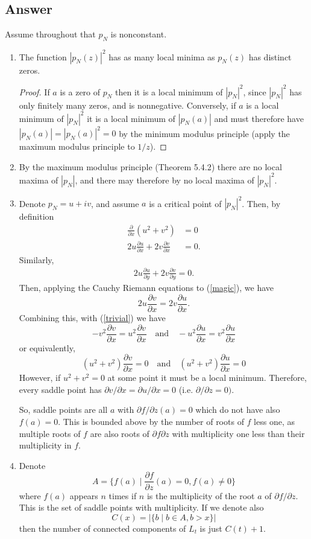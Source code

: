 \documentclass[11pt]{article}
\begin{document}
\subsection{Answer}
Assume throughout that $p_N$ is nonconstant.
\begin{enumerate}
\item The function $|p_N(z)|^2$ has as many local minima as $p_N(z)$ has distinct zeros. 
\begin{proof}
If $a$ is a zero of $p_N$ then it is a local minimum of $|p_N|^2$, since $|p_N|^2$ has only finitely many zeros, and is nonnegative. Conversely, if $a$ is a local minimum of $|p_N|^2$ it is a local minimum of  $|p_N(a)|$ and must therefore have $|p_N(a)| = |p_N(a)|^2 = 0 $ by the minimum modulus principle (apply the maximum modulus principle to $1/z$).
\end{proof}
\item By the maximum modulus principle (Theorem 5.4.2) there are no local maxima of $|p_N|$, and there may therefore by no local maxima of $|p_N|^2$.
\item Denote $p_N = u + i v$, and assume $a$ is a critical point of $|p_N|^2$. Then, by definition 
\begin{align}
\label{trivial} \frac{\partial}{\partial x} \left( u^2 + v^2 \right) &= 0\\
2 u \frac{\partial u}{\partial x}  + 2 v \frac{\partial v }{\partial x} &= 0.
\end{align}
Similarly, 
\begin{align}\label{magic}2u \frac{\partial u}{\partial y} + 2 v \frac{\partial v}{\partial y} = 0. \end{align}
Then, applying the Cauchy Riemann equations to  (\ref{magic}), we have
\[2 u \frac{\partial v}{\partial x} =  2 v \frac{\partial u }{\partial x}.\]
Combining this, with (\ref{trivial}) we have
\[- v^2 \frac{\partial v}{\partial x} = u^2 \frac{\partial v}{\partial x} \quad\mbox{and}\quad - u^2 \frac{\partial u}{\partial x} = v^2 \frac{\partial u}{\partial x} \]
or equivalently, 
\[ (u^2+ v^2) \frac{\partial v}{\partial x}  = 0 \quad\mbox{and}\quad ( u^2 + v^2) \frac{\partial u}{\partial x} = 0 \]
However, if $u^2 + v^2 =0$ at some point it must  be a local minimum. Therefore, every saddle point has $\partial v/ \partial x = \partial u / \partial x = 0$ (i.e. $\partial / \partial z = 0) $. 

So, saddle points are all $a$ with  $\partial f / \partial z ( a) = 0$ which do not have also $f(a) = 0$. This is bounded above by the number of roots of $f$ less one, as multiple roots of $f$ are also roots of $\partial f \partial z$ with multiplicity one less than their multiplicity in $f$.
\item 
Denote 
\[A = \{ f(a) \mid \frac{\partial f }{ \partial z}( a ) = 0, f(a) \neq 0\}\]
where $f(a)$ appears $n$ times if $n$ is the multiplicity of the root $a$ of $\partial f / \partial z$. This is the set of saddle points with multiplicity. If we denote also
\[C(x) = |\{ b \mid b \in A , b > x\} | \]
then the number of connected components of $L_t$ is just $C(t) + 1$.


\end{enumerate}
\end{document}
